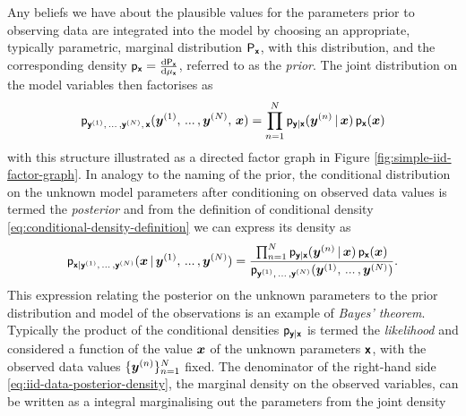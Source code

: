 Any beliefs we have about the plausible values for the parameters prior to observing data are integrated into the model by choosing an appropriate, typically parametric, marginal distribution $\mathsf{P}_{\boldsymbol{\mathsf{x}}}$, with this distribution, and the corresponding density $\mathsf{p}_{\boldsymbol{\mathsf{x}}} = \frac{\mathrm{d} \mathsf{P}_{\boldsymbol{\mathsf{x}}}}{\mathrm{d} \mu_{\boldsymbol{\mathsf{x}}}}$, referred to as the \emph{prior}. The joint distribution on the model variables then factorises as
\begin{equation}\label{eq:iid-data-joint-density-factorisation}
  \mathsf{p}_{\boldsymbol{\mathsf{y}}^{(1)},\,...\,,\boldsymbol{\mathsf{y}}^{(N)},\,\boldsymbol{\mathsf{x}}}(\boldsymbol{y}^{(1)},\,...\,,\boldsymbol{y}^{(N)},\,\boldsymbol{x}) =
  \prod_{n=1}^N \mathsf{p}_{\boldsymbol{\mathsf{y}}|\boldsymbol{\mathsf{x}}}(\boldsymbol{y}^{(n)}\operatorname{|}\boldsymbol{x})\,
  \mathsf{p}_{\boldsymbol{\mathsf{x}}}(\boldsymbol{x})
\end{equation}
with this structure illustrated as a directed factor graph in Figure \ref{fig:simple-iid-factor-graph}. In analogy to the naming of the prior, the conditional distribution on the unknown model parameters after conditioning on observed data values is termed the \emph{posterior} and from the definition of conditional density \eqref{eq:conditional-density-definition} we can express its density as
\begin{equation}\label{eq:iid-data-posterior-density}
  \mathsf{p}_{\boldsymbol{\mathsf{x}}|\boldsymbol{\mathsf{y}}^{(1)},\,...\,,\boldsymbol{\mathsf{y}}^{(N)}}(\boldsymbol{x} \operatorname{|} \boldsymbol{y}^{(1)},\,...\,,\boldsymbol{y}^{(N)}) =
\frac{
  \prod_{n=1}^N \mathsf{p}_{\boldsymbol{\mathsf{y}}|\boldsymbol{\mathsf{x}}}(\boldsymbol{y}^{(n)}\operatorname{|}\boldsymbol{x})\,
  \mathsf{p}_{\boldsymbol{\mathsf{x}}}(\boldsymbol{x})
}
{
 \mathsf{p}_{\boldsymbol{\mathsf{y}}^{(1)},\,...\,,\boldsymbol{\mathsf{y}}^{(N)}}(\boldsymbol{y}^{(1)},\,...\,,\boldsymbol{y}^{(N)})
}.
\end{equation}
This expression relating the posterior on the unknown parameters to the prior distribution and model of the observations is an example of \emph{Bayes' theorem}. Typically the product of the conditional densities $\mathsf{p}_{\boldsymbol{\mathsf{y}}|\boldsymbol{\mathsf{x}}}$ is termed the \emph{likelihood} and considered a function of the value $\boldsymbol{x}$ of the unknown parameters $\boldsymbol{\mathsf{x}}$, with the observed data values $\lbrace \boldsymbol{y}^{(n)} \rbrace_{n=1}^N$ fixed. The denominator of the right-hand side \eqref{eq:iid-data-posterior-density}, the marginal density on the observed variables, can be written as a integral marginalising out the parameters from the joint density
